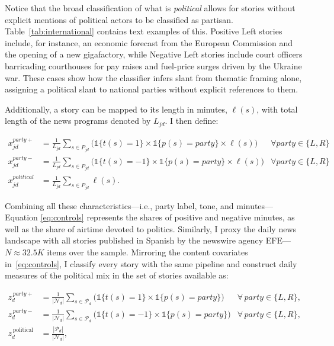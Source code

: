 \documentclass[12pt]{article}
\begin{document}
	Notice that the broad classification of what is \emph{political} allows for stories without explicit mentions of  political actors to be classified as partisan. Table~\ref{tab:international} contains text examples of this.  Positive Left stories include, for instance,  an economic forecast from the European Commission and the opening of a new gigafactory, while Negative Left stories include court officers barricading courthouses for pay raises and fuel-price surges driven by the Ukraine war. These cases show how the classifier infers slant from thematic framing alone, assigning a political slant to national parties without explicit references to them. 
	
	
	Additionally, a story can be mapped to its length in minutes, \( \ell(s)\), with total length of the news programs  denoted by $L_{jd}$. I then define: 
	
	
	


		\begin{equation}\label{eq:controls}
		\begin{aligned}
			x_{jd}^{party+}&= \frac{1}{L_{jd}} \sum_{s \in P_{jd}}\bigg(\mathds{1}\{t(s)=1\} \times \mathds{1}\{p(s)=party\}\times \ell(s) \bigg) &\forall party \in \{L,R\} \\
			x_{jd}^{party-}&= \frac{1}{L_{jd}} \sum_{s \in P_{jd}}\bigg( \mathds{1}\{t(s)=-1\} \times \mathds{1}\{p(s)=party\} \times \ell(s)\bigg) &\forall party \in \{L,R\} \\
			x_{jd}^{political}&=\frac{1}{L_{jd}} \sum_{s \in P_{jd}}\ell(s).
		\end{aligned}
	\end{equation} 
	

 Combining all these characteristics—i.e., party label, tone, and minutes— Equation \eqref{eq:controls} represents the  shares of positive and negative minutes, as well as the share of airtime devoted to politics.	Similarly, I proxy the daily news landscape with all stories published in Spanish by the newswire agency EFE—$N\approx32.5K$ items over the sample. Mirroring the content covariates in~\eqref{eq:controls}, I classify every  story with the same pipeline and construct daily measures of the political mix in the set of stories available as:
	
	\begin{equation}\label{eq:efe}
		\begin{aligned}
			z_d^{\,party+} &= \frac{1}{|\mathcal{N}_d|}\sum_{s\in \mathcal{P}_d}
			\bigg(\mathds{1}\{t(s)=1\}\times \mathds{1}\{p(s)=\textit{party}\}\bigg)
			&\forall\,\textit{party}\in\{L,R\},\\
			z_d^{\,party-} &= \frac{1}{|\mathcal{N}_d|}\sum_{s\in \mathcal{P}_d}
			\bigg(\mathds{1}\{t(s)=-1\}\times \mathds{1}\{p(s)=\textit{party}\}\bigg)
			&\forall\,\textit{party}\in\{L,R\},\\
			z_d^{\,\text{political}} &= \frac{|\mathcal{P}_d|}{|\mathcal{N}_d|},
		\end{aligned}
	\end{equation}
	
\end{document}
